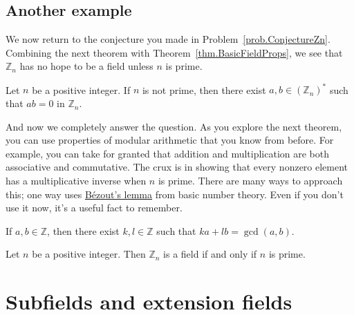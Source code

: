 \subsection{Another example}
We now return to the conjecture you made in Problem~\ref{prob.ConjectureZn}. Combining the next theorem with Theorem~\ref{thm.BasicFieldProps}, we see that $\mathbb{Z}_n$ has no hope to be a field unless $n$ is prime.

\begin{theorem}
Let $n$ be a positive integer. If $n$ is not prime, then there exist $a,b\in (\mathbb{Z}_n)^*$ such that $ab=0$ in $\mathbb{Z}_n$.
\end{theorem}

And now we completely answer the question. As you explore the next theorem, you can use properties of modular arithmetic that you know from before. For example, you can take for granted that addition and multiplication are both associative and commutative. The crux is in showing that every nonzero element has a multiplicative inverse when $n$ is prime. There are many ways to approach this; one way uses \href{https://en.wikipedia.org/wiki/Bezout\%27s_identity}{B\'ezout's lemma} from basic number theory. Even if you don't use it now, it's a  useful fact to remember.

\begin{fact}\label{Fact.Bezout}
If $a,b\in \mathbb{Z}$, then there exist $k,l\in \mathbb{Z}$ such that $ka+lb = \gcd(a,b)$.
\end{fact}

\begin{theorem}\label{thm.ZpField}
Let $n$ be a positive integer. Then $\mathbb{Z}_n$ is a field if and only if $n$ is prime.
\end{theorem}

\section{Subfields and extension fields}

